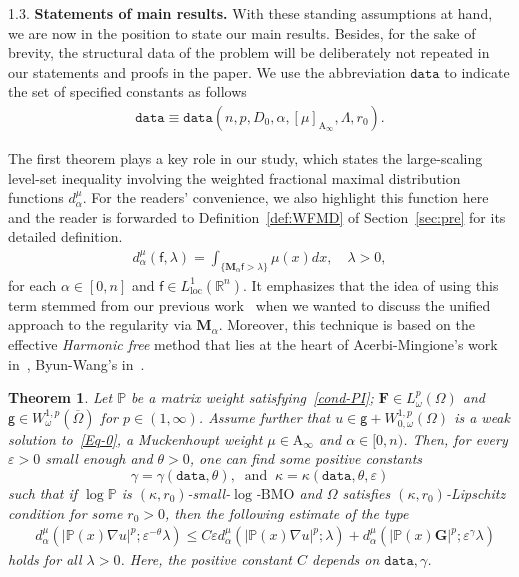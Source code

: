 \documentclass[a4paper, 11pt]{article}
\newtheorem{theorem}{Theorem}[section]
\begin{document}
1.3. \textbf{Statements of main results.} With these standing assumptions at hand, we are now in the position to state our main results. Besides, for the sake of brevity, the structural data of the problem will be deliberately not repeated in our statements and proofs in the paper. We use the abbreviation $\mathtt{data}$ to indicate the set of specified constants as follows
\begin{align*}
\mathtt{data} \equiv \texttt{data}\left(n,p,D_0,\alpha,[\mu]_{\mathrm{A}_{\infty}},\Lambda,r_0\right).
\end{align*}

The first theorem plays a key role in our study, which states the large-scaling level-set inequality involving the weighted fractional maximal distribution functions $d^\mu_\alpha$. For the readers' convenience, we also highlight this function here and the reader is forwarded to Definition~\ref{def:WFMD} of Section~\ref{sec:pre} for its detailed definition. 
\begin{align*}
d^\mu_\alpha(\mathsf{f},\lambda) = \int_{\{\mathbf{M}_{\alpha}\mathsf{f}>\lambda\}} \mu(x) dx, \quad \lambda > 0,
\end{align*}
for each $\alpha \in [0,n]$ and $\mathsf{f} \in L^1_{\mathrm{loc}}(\mathbb{R}^n)$. It emphasizes that the idea of using this term stemmed from our previous work~\cite{PNJFA} when we wanted to discuss the unified approach to the regularity via $\mathbf{M}_\alpha$. Moreover, this technique is based on the effective \emph{Harmonic free} method that lies at the heart of Acerbi-Mingione's work in~\cite{AM2007}, Byun-Wang's in~\cite{BW2004}.  
\begin{theorem}\label{theo:A}
Let $\mathbb{P}$ be a matrix weight satisfying~\eqref{cond-PI}; $\mathbf{F} \in L^{p}_{\omega}(\Omega)$ and $\mathsf{g} \in W^{1,p}_{\omega}(\overline{\Omega})$ for $p \in (1,\infty)$. Assume further that $u \in \mathsf{g} + W^{1,p}_{0,\omega}(\Omega)$ is a weak solution to~\eqref{Eq-0}, a Muckenhoupt weight $\mu \in \mathrm{A}_{\infty}$ and $\alpha \in [0,n)$. Then, for every $\varepsilon>0$ small enough  and $\theta>0$, one can find some positive constants 
$$\gamma = \gamma(\mathtt{data},\theta), \ \mbox{ and } \ \kappa = \kappa(\mathtt{data},\theta,\varepsilon)$$ 
such that if $\log \mathbb{P}$ is $(\kappa,r_0)$-small-$\log$-$\mathrm{BMO}$ and $\Omega$ satisfies $(\kappa,r_0)$-Lipschitz condition for some $r_0>0$, then the following estimate of the type
\begin{align}\label{dist-ineq}
 & d^{\mu}_{\alpha}(|\mathbb{P}(x)\nabla u|^{p};\varepsilon^{-\theta}\lambda) \le C \varepsilon d^{\mu}_{\alpha}(|\mathbb{P}(x)\nabla u|^{p};\lambda) + d^{\mu}_{\alpha}(|\mathbb{P}(x)\mathbf{G}|^{p};\varepsilon^{\gamma}\lambda)
\end{align}
holds for all $\lambda>0$. Here, the positive constant $C$ depends on $\mathtt{data}, \gamma$.
\end{theorem}
\end{document}
